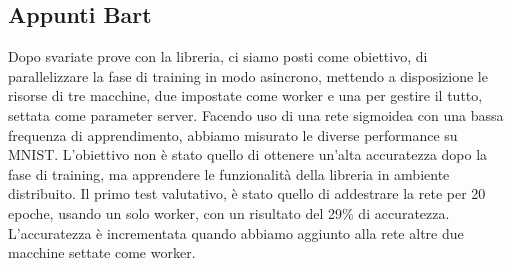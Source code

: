 \documentclass[DIV=calc, paper=a4, fontsize=11pt]{scrartcl}	 %
\begin{document}
\begin{multicols}{2}
		\section{Appunti Bart}		
		Dopo svariate prove con la libreria, ci siamo posti come obiettivo, di parallelizzare la fase di training in modo asincrono, mettendo a disposizione le risorse di tre macchine, due impostate come worker e una per gestire il tutto, settata come parameter server. Facendo uso di una rete sigmoidea con una bassa frequenza di apprendimento, abbiamo misurato le diverse performance su MNIST. L'obiettivo non è stato quello di ottenere un'alta accuratezza dopo la fase di training, ma apprendere le funzionalità della libreria in ambiente distribuito.
		Il primo test valutativo, è stato quello di addestrare la rete per 20 epoche, usando un solo worker, con un risultato del 29\% di accuratezza. L'accuratezza è incrementata quando abbiamo aggiunto alla rete altre due macchine settate come worker.

\end{multicols}
\end{document}
